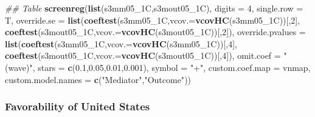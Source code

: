 \documentclass[
]{article}
\newenvironment{Shaded}{\begin{snugshade}}{\end{snugshade}}
\newcommand{\CommentTok}[1]{\textcolor[rgb]{0.56,0.35,0.01}{\textit{#1}}}
\newcommand{\DataTypeTok}[1]{\textcolor[rgb]{0.13,0.29,0.53}{#1}}
\newcommand{\DecValTok}[1]{\textcolor[rgb]{0.00,0.00,0.81}{#1}}
\newcommand{\FloatTok}[1]{\textcolor[rgb]{0.00,0.00,0.81}{#1}}
\newcommand{\KeywordTok}[1]{\textcolor[rgb]{0.13,0.29,0.53}{\textbf{#1}}}
\newcommand{\NormalTok}[1]{#1}
\newcommand{\StringTok}[1]{\textcolor[rgb]{0.31,0.60,0.02}{#1}}
\begin{document}
\begin{Shaded}
\begin{Highlighting}[]
\CommentTok{## Table}
\KeywordTok{screenreg}\NormalTok{(}\KeywordTok{list}\NormalTok{(s3mm05_1C,s3mout05_1C), }\DataTypeTok{digits =} \DecValTok{4}\NormalTok{, }\DataTypeTok{single.row =}\NormalTok{ T,}
          \DataTypeTok{override.se =} \KeywordTok{list}\NormalTok{(}\KeywordTok{coeftest}\NormalTok{(s3mm05_1C,}\DataTypeTok{vcov.=}\KeywordTok{vcovHC}\NormalTok{(s3mm05_1C))[,}\DecValTok{2}\NormalTok{],}
                             \KeywordTok{coeftest}\NormalTok{(s3mout05_1C,}\DataTypeTok{vcov.=}\KeywordTok{vcovHC}\NormalTok{(s3mout05_1C))[,}\DecValTok{2}\NormalTok{]),}
          \DataTypeTok{override.pvalues =} \KeywordTok{list}\NormalTok{(}\KeywordTok{coeftest}\NormalTok{(s3mm05_1C,}\DataTypeTok{vcov.=}\KeywordTok{vcovHC}\NormalTok{(s3mm05_1C))[,}\DecValTok{4}\NormalTok{],}
                                  \KeywordTok{coeftest}\NormalTok{(s3mout05_1C,}\DataTypeTok{vcov.=}\KeywordTok{vcovHC}\NormalTok{(s3mout05_1C))[,}\DecValTok{4}\NormalTok{]),}
          \DataTypeTok{omit.coef =} \StringTok{"(wave)"}\NormalTok{, }\DataTypeTok{stars =} \KeywordTok{c}\NormalTok{(}\FloatTok{0.1}\NormalTok{,}\FloatTok{0.05}\NormalTok{,}\FloatTok{0.01}\NormalTok{,}\FloatTok{0.001}\NormalTok{), }\DataTypeTok{symbol =} \StringTok{"+"}\NormalTok{,}
          \DataTypeTok{custom.coef.map =}\NormalTok{ vnmap, }
          \DataTypeTok{custom.model.names =} \KeywordTok{c}\NormalTok{(}\StringTok{"Mediator"}\NormalTok{,}\StringTok{"Outcome"}\NormalTok{))}
\end{Highlighting}
\end{Shaded}

\hypertarget{favorability-of-united-states}{%
\subsubsection{Favorability of United
States}\label{favorability-of-united-states}}
\end{document}
